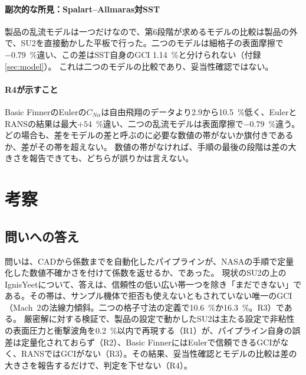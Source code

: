 \documentclass[twocolumn]{labreport}
\newcommand{\CNa}{C_{N\alpha}}
\begin{document}
\paragraph{副次的な所見：Spalart--Allmaras対SST}
製品の乱流モデルは一つだけなので、第6段階が求めるモデルの比較は製品の外で、SU2を直接動かした平板で行った。二つのモデルは細格子の表面摩擦で$-0.79$~\%違い、この差はSST自身のGCI 1.14~\%と分けられない（付録\ref{sec:model}）。
これは二つのモデルの比較であり、妥当性確認ではない。

\paragraph{R4が示すこと}
Basic FinnerのEulerの$\CNa$は自由飛翔のデータより2.9から10.5~\%低く、EulerとRANSの結果は最大$+54$~\%違い、二つの乱流モデルは表面摩擦で$-0.79$~\%違う。どの場合も、差をモデルの差と呼ぶのに必要な数値の帯がないか旗付きであるか、差がその帯を超えない。
数値の帯がなければ、手順の最後の段階は差の大きさを報告できても、どちらが誤りかは言えない。

\section{考察}
\label{sec:discussion}

\subsection{問いへの答え}
\label{sec:answer}

問いは、CADから係数までを自動化したパイプラインが、NASAの手順で定量化した数値不確かさを付けて係数を返せるか、であった。
現状のSU2の上のIgnisYeetについて、答えは、信頼性の低い広い帯一つを除き「まだできない」である。その帯は、サンプル機体で拒否も使えないともされていない唯一のGCI（Mach~2の法線力傾斜。二つの格子寸法の定義で10.6~\%か16.3~\%。R3）である。
厳密解に対する検証で、製品の設定で動かしたSU2は主たる設定で非粘性の表面圧力と衝撃波角を0.2~\%以内で再現する（R1）が、パイプライン自身の誤差は定量化されておらず（R2）、Basic FinnerにはEulerで信頼できるGCIがなく、RANSではGCIがない（R3）。その結果、妥当性確認とモデルの比較は差の大きさを報告するだけで、判定を下せない（R4）。
\end{document}
